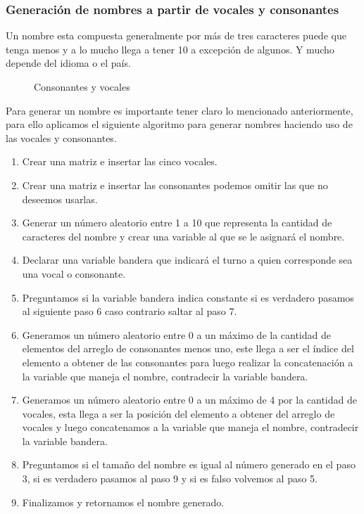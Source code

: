 \subsubsection{Generaci\'on de nombres a partir de vocales y consonantes}
Un nombre esta compuesta generalmente por m\'as de tres caracteres puede que tenga menos y a lo mucho llega a tener 10 a excepci\'on de algunos. Y mucho depende del idioma o el pa\'is.
\begin{figure}[H]
\centering
{}
\caption{Consonantes y vocales} \label{fig:consonantes y vocales}
\end{figure}
Para generar un nombre es importante tener claro lo mencionado anteriormente, para ello aplicamos el siguiente algoritmo para generar nombres haciendo uso de las vocales y consonantes.
\begin{enumerate}
\item Crear una matriz e insertar las cinco vocales.
\item Crear una matriz e insertar las consonantes podemos omitir las que no deseemos usarlas.
\item Generar un n\'umero aleatorio entre 1 a 10 que representa la cantidad de caracteres del nombre y crear una variable al que se le asignar\'a el nombre.
\item Declarar una variable bandera que indicar\'a el turno a quien corresponde sea una vocal o consonante.
\item Preguntamos si la variable bandera indica constante si es verdadero pasamos al siguiente paso 6 caso contrario saltar al paso 7.
\item Generamos un n\'umero aleatorio entre 0 a un m\'aximo de la cantidad de elementos del arreglo de consonantes menos uno, este llega a ser el \'indice del elemento a obtener de las consonantes para luego realizar la concatenaci\'on a la variable que maneja el nombre, contradecir la variable bandera.
\item Generamos un n\'umero aleatorio entre 0 a un m\'aximo de 4 por la cantidad de vocales, esta llega a ser la posici\'on del elemento a obtener del arreglo de vocales y luego concatenamos a la variable que maneja el nombre, contradecir la variable bandera.
\item Preguntamos si el tama\~no del nombre es igual al n\'umero generado en el paso 3, si es verdadero pasamos al paso 9 y si es falso volvemos al paso 5.
\item Finalizamos y retornamos el nombre generado. 
\end{enumerate}
